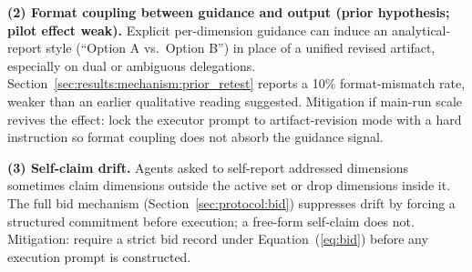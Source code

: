 \noindent\textbf{(2) Format coupling between guidance and output (prior hypothesis; pilot effect weak).} Explicit per-dimension guidance can induce an analytical-report style (``Option A vs.\ Option B'') in place of a unified revised artifact, especially on dual or ambiguous delegations. Section~\ref{sec:results:mechanism:prior_retest} reports a 10\% format-mismatch rate, weaker than an earlier qualitative reading suggested. Mitigation if main-run scale revives the effect: lock the executor prompt to artifact-revision mode with a hard instruction so format coupling does not absorb the guidance signal.

\noindent\textbf{(3) Self-claim drift.} Agents asked to self-report addressed dimensions sometimes claim dimensions outside the active set or drop dimensions inside it. The full bid mechanism (Section~\ref{sec:protocol:bid}) suppresses drift by forcing a structured commitment before execution; a free-form self-claim does not. Mitigation: require a strict bid record under Equation~(\ref{eq:bid}) before any execution prompt is constructed.
